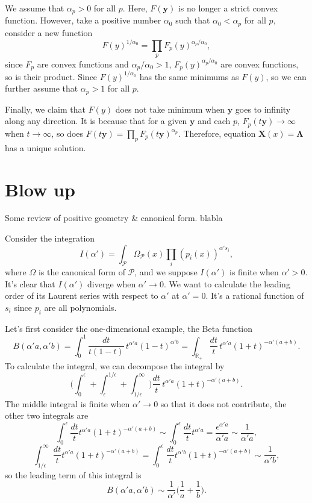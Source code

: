 \documentclass[12pt]{article}
\theoremstyle{definition}
\theoremstyle{plain}
\begin{document}
We assume that $\alpha_p>0$ for all $p$. Here, $F(\mathbf y)$ is no longer a strict convex function. However, take a positive number $\alpha_0$ such that $\alpha_0< \alpha_p$ for all $p$, consider a new function
\[
	F(y)^{1/\alpha_0}=\prod_p F_p(y)^{\alpha_p/\alpha_0},
\]
since $F_p$ are convex functions and $\alpha_p/\alpha_0>1$, $F_p(y)^{\alpha_p/\alpha_0}$ are convex functions, so is their product. Since $F(y)^{1/\alpha_0}$ has the same minimums as $F(y)$, so we can further assume that $\alpha_p>1$ for all $p$.

Finally, we claim that $F(y)$ does not take minimum when $\mathbf{y}$ goes to infinity along any direction. It is because that for a given $\mathbf{y}$ and each $p$, $F_p(t\mathbf{y})\to \infty$ when $t\to \infty$, so does $F(t\mathbf{y})=\prod_p F_p(t\mathbf{y})^{\alpha_p}$. Therefore, equation $\mathbf{X}(x)=\mathbf{\Lambda}$ has a unique solution.

\section{Blow up}

Some review of positive geometry \& canonical form. blabla

Consider the integration
\[
	I(\alpha')=\int_{\mathcal P} \Omega_{\mathcal P}(x)\prod_i(p_i(x))^{\alpha' s_i},
\]
where $\Omega$ is the canonical form of $\mathcal P$, and we suppose $I(\alpha')$ is finite when $\alpha'>0$.
It's clear that $I(\alpha')$ diverge when $\alpha'\to 0$. We want to calculate the leading order of its Laurent series with respect to $\alpha'$ at $\alpha'=0$. It's a rational function of $s_i$ since $p_i$ are all polynomials.


Let's first consider the one-dimensional example, the Beta function 
\[
	B(\alpha' a,\alpha' b)=\int_0^1 \frac{dt}{t(1-t)}\, t^{\alpha' a}(1-t)^{\alpha' b}=\int_{\mathbb R_+}\frac{dt}{t}\, t^{\alpha' a}(1+t)^{-\alpha'(a+b)}.
\]
To calculate the integral, we can decompose the integral by 
\[
	\biggl(\int_{0}^\epsilon +\int_\epsilon^{1/\epsilon}+\int_{1/\epsilon}^\infty\biggr)\frac{dt}{t}\, t^{\alpha' a}(1+t)^{-\alpha'(a+b)}.
	\]
The middle integral is finite when $\alpha'\to 0$ so that it does not contribute, the other two integrals are
	\[
		\int_0^\epsilon \frac{dt}t t^{\alpha' a}(1+t)^{-\alpha'(a+b)}
	\sim \int_0^\epsilon \frac{dt}t t^{\alpha' a} 
	= \frac{\epsilon^{\alpha' a}}{\alpha'a} \sim \frac{1}{\alpha'a},
	\]
	\[
	\int_{1/\epsilon}^\infty \frac{dt}t t^{\alpha' a}(1+t)^{-\alpha'(a+b)} 
	= \int_0^\epsilon \frac{dt}{t} t^{\alpha' b}(1+t)^{-\alpha' (a+b)}
	\sim \frac{1}{\alpha' b},
\]
so the leading term of this integral is 
\[
	B(\alpha' a,\alpha' b)\sim\frac 1{\alpha'}\biggl(\frac 1a+\frac 1b\biggr).
\]
\end{document}
